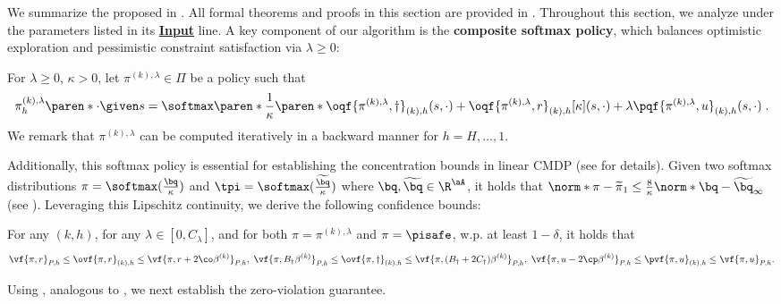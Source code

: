 We summarize the proposed \MDPalgo in .
All formal theorems and proofs in this section are provided in .
Throughout this section, we analyze  under the parameters listed in its \hyperref[algo:zero-vio-linear MDP]{\textbf{Input}} line.
A key component of our algorithm is the \textbf{composite softmax policy}, which balances optimistic exploration and pessimistic constraint satisfaction via $\lambda \geq 0$:
\begin{definition}\label{def:composite-softmax-policy}
For $\lambda \geq 0$, $\kappa > 0$, let $\pi^{(k), \lambda}\in \Pi$ be a policy such that 
\begin{align*}
\pi^{(k), \lambda}_{h}\paren*{\cdot \given s} = \softmax\paren*{\frac{1}{\kappa}\paren*{
\oqf{\pi^{(k), \lambda}, \dagger}_{(k), h}(s, \cdot) + 
\oqf{\pi^{(k), \lambda}, r}_{(k), h}[\kappa](s, \cdot) + 
\lambda \pqf{\pi^{(k), \lambda}, u}_{(k), h}(s, \cdot)}}\;.
\end{align*}
We remark that $\pi^{(k), \lambda}$ can be computed iteratively in a backward manner for $h=H, \dots, 1$.
\end{definition}
Additionally, this softmax policy is essential for establishing the concentration bounds in linear CMDP (see \citet{ghosh2022provably} for details).
Given two softmax distributions $\pi = \softmax(\frac{\bq}{\kappa})$ and $\tpi = \softmax(\frac{\widetilde{\bq}}{\kappa})$ where $\bq, \widetilde{\bq}\in \R^\aA$, it holds that $\norm*{\pi - \widetilde{\pi}}_1 \leq \frac{8}{\kappa} \norm*{\bq - \widetilde{\bq}}_\infty$ (see ).
Leveraging this Lipschitz continuity, we derive the following confidence bounds:
\begin{lemma}\label{lemma:opt-pes-MDP-main}
For any $(k, h)$, for any $\lambda \in [0, C_\lambda]$, and for both $\pi = \pi^{(k), \lambda}$ and $\pi=\pisafe$, w.p. at least $1-\delta$, it holds that
\begin{align*}
\vf{\pi,r}_{P, h} \leq \ovf{\pi,r}_{(k), h} \leq  \vf{\pi,r+ 2\co \beta^{(k)}}_{P, h},\;
\vf{\pi,B_\dagger\beta^{(k)}}_{P, h} \leq \ovf{\pi,\dagger}_{(k), h} \leq  \vf{\pi,(B_\dagger + 2C_\dagger) \beta^{(k)}}_{P, h},\;
\vf{\pi,u-2\cp \beta^{(k)}}_{P, h} \leq \pvf{\pi,u}_{(k), h} \leq \vf{\pi,u}_{P, h}.
\end{align*}
\end{lemma}
Using , analogous to , we next establish the zero-violation guarantee.




